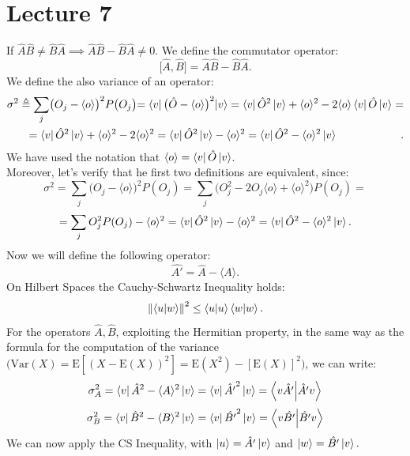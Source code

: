 \documentclass{article}
\begin{document}
\section{Lecture 7}
If $\hat{A}\hat{B} \neq \hat{B}\hat{A} \implies \hat{A}\hat{B} - \hat{B}\hat{A} \neq 0.$
We define the commutator operator:$$ \bigl[\hat{A},\hat{B} \bigl] = \hat{A}\hat{B} - \hat{B}\hat{A}.$$ 
We define the also variance of an operator: 
\begin{align*}
   \sigma^2 \triangleq \sum_j \bigl( O_j -\langle o \rangle \bigl)^2 P \bigl(O_j\bigl) = \bra{v} \bigl( \hat{O} - \langle o \rangle \bigl)^2 \ket{v}   = \bra{v} \hat{O}^2 \ket{v} + \langle o \rangle^2 -2 \langle o \rangle \bra{v} \hat{O} \ket{v} = \\ = \bra{v} \hat{O}^2 \ket{v} + \langle o \rangle^2 -2 \langle o \rangle^2 =  \bra{v} \hat{O}^2 \ket{v} - \langle o \rangle^2 = \bra{v} \hat{O}^2 - \langle o \rangle^2 \ket{v} \hspace{2 cm}.
\end{align*}
We have used the notation that $\langle o \rangle = \bra{v}\hat{O}\ket{v}$.\\
Moreover, let's verify that he first two definitions are equivalent, since:
$$\sigma^2 = \sum_j \biggl(O_j - \langle o \rangle\biggl)^2 P(O_j) = \sum_j \bigl(O_j^2-2O_j\langle o \rangle + \langle o \rangle^2 \bigl) P(O_j)=$$
$$= \sum_j O_j^2P(O_j)- \langle o \rangle^2 = \bra{v}\hat{O}^2\ket{v}-\langle o \rangle^2 = \bra{v}\hat{O}^2-\langle o \rangle^2 \ket{v}.$$
Now we will define the following operator:
$$\hat{A'} = \hat{A} - \langle A \rangle.$$
On Hilbert Spaces the Cauchy-Schwartz Inequality holds:
$$ \norm{\bra{u}\ket{w}}^2 \leq \bra{u}\ket{u}\bra{w}\ket{w}. $$
For the operators $\hat{A}, \hat{B}$, exploiting the Hermitian property, in the same way
as the formula for the computation of the variance$ \biggl( \mathrm{Var}(X) = \mathrm{E}[(X - \mathrm{E}(X))^2] = \mathrm{E}(X^2) - [\mathrm{E}(X)]^2 \biggl)$, we can write:
$$\sigma_A^2 =  \bra{v} \hat{A}^2 - \langle A \rangle ^2 \ket{v} = \bra{v} \hat{A'}^2 \ket{v}= \bra{v \hat{A'}} \ket{\hat{A'} v}$$
$$\sigma_B^2 =  \bra{v} \hat{B}^2 - \langle B \rangle ^2 \ket{v} = \bra{v} \hat{B'}^2 \ket{v}= \bra{v \hat{B'}} \ket{\hat{B'} v}$$ 
We can now apply the CS Inequality, with $\ket{u} = \hat{A'}\ket{v}$ and $ \ket{w} = \hat{B'}\ket{v}.$
\end{document}
